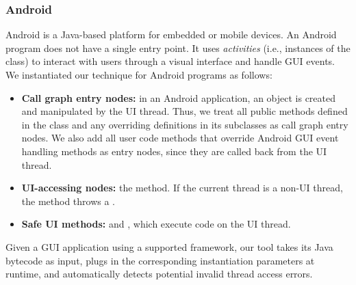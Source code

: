 \smallstep

\tinystep
\subsubsection{Android}

Android is a Java-based platform for embedded or mobile devices. 
An Android program does not have a single entry point.
It uses \textit{activities}
(i.e., instances of the  class)
to interact with users through a visual interface and handle GUI events.
We instantiated our technique for Android programs as follows:


\preitemizespace

\begin{itemize}

\item \textbf{Call graph entry nodes:} in an Android application,
an  object is created and manipulated by the UI thread. Thus, we treat
all public methods defined in the  class 
and any overriding definitions in its subclasses as call graph entry nodes.
We also add all user code methods that override Android GUI event handling methods
as entry nodes, since they are called back from the UI thread.

\tinystep

\item \textbf{UI-accessing nodes:} the  method.
If the current
thread is a non-UI thread, the  method throws
a .

\tinystep

\item \textbf{Safe UI methods:}  
and , which execute code on the UI thread. 

\end{itemize}

\tinystep

Given a GUI application using a supported framework, our tool 
takes its Java bytecode as input, 
plugs in the corresponding instantiation parameters at runtime,
and automatically detects potential invalid thread access
errors.

